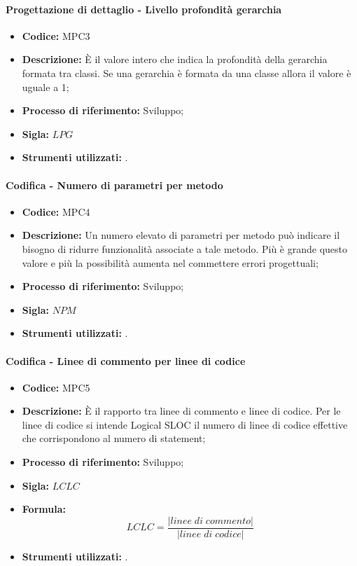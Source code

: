 \paragraph{Progettazione di dettaglio - Livello profondità gerarchia}
    \begin{itemize}
        \item \textbf{Codice:} MPC3
        \item \textbf{Descrizione:} È il valore intero che indica la profondità della gerarchia formata tra classi. Se una gerarchia è formata da una classe allora il valore è uguale a 1;
        \item \textbf{Processo di riferimento:} Sviluppo;
        \item \textbf{Sigla:} $LPG$
        \item \textbf{Strumenti utilizzati:} .
    \end{itemize}

\paragraph{Codifica - Numero di parametri per metodo}
    \begin{itemize}
        \item \textbf{Codice:} MPC4
        \item \textbf{Descrizione:} Un numero elevato di parametri per metodo può indicare il bisogno di ridurre funzionalità associate a tale metodo. Più è grande questo valore e più la possibilità aumenta nel commettere errori progettuali;
        \item \textbf{Processo di riferimento:} Sviluppo;
        \item \textbf{Sigla:} $NPM$
        \item \textbf{Strumenti utilizzati:} .
    \end{itemize}

\paragraph{Codifica - Linee di commento per linee di codice}
    \begin{itemize}
        \item \textbf{Codice:} MPC5
        \item \textbf{Descrizione:} È il rapporto tra linee di commento e linee di codice. Per le linee di codice si intende Logical SLOC il numero di linee di codice effettive che corrispondono al numero di statement;
        \item \textbf{Processo di riferimento:} Sviluppo;
        \item \textbf{Sigla:} $LCLC$
        \item \textbf{Formula:}$$LCLC = \frac{|linee \; di \; commento|}{|linee \; di \; codice|}$$
        \item \textbf{Strumenti utilizzati:} .
    \end{itemize}

